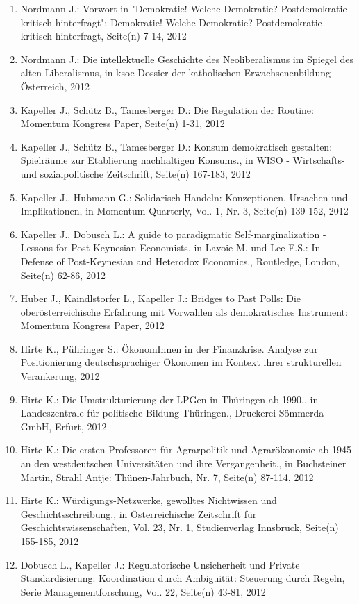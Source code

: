 \begin{enumerate}
	 \item Nordmann J.: Vorwort in "Demokratie! Welche Demokratie? Postdemokratie kritisch hinterfragt": Demokratie! Welche Demokratie? Postdemokratie kritisch hinterfragt, Seite(n) 7-14, 2012
	 \item Nordmann J.: Die intellektuelle Geschichte des Neoliberalismus im Spiegel des alten Liberalismus, in ksoe-Dossier der katholischen Erwachsenenbildung Österreich, 2012
	 \item Kapeller J., Schütz B., Tamesberger D.: Die Regulation der Routine: Momentum Kongress Paper, Seite(n) 1-31, 2012
	 \item Kapeller J., Schütz B., Tamesberger D.: Konsum demokratisch gestalten: Spielräume zur Etablierung nachhaltigen Konsums., in WISO - Wirtschafts- und sozialpolitische Zeitschrift, Seite(n) 167-183, 2012
	 \item Kapeller J., Hubmann G.: Solidarisch Handeln: Konzeptionen, Ursachen und Implikationen, in Momentum Quarterly, Vol. 1, Nr. 3, Seite(n) 139-152, 2012
	 \item Kapeller J., Dobusch L.: A guide to paradigmatic Self-marginalization - Lessons for Post-Keynesian Economists, in Lavoie M. und Lee F.S.: In Defense of Post-Keynesian and Heterodox Economics., Routledge, London, Seite(n) 62-86, 2012
	 \item Huber J., Kaindlstorfer L., Kapeller J.: Bridges to Past Polls: Die oberösterreichische Erfahrung mit Vorwahlen als demokratisches Instrument: Momentum Kongress Paper, 2012
	 \item Hirte K., Pühringer S.: ÖkonomInnen in der Finanzkrise. Analyse zur Positionierung deutschsprachiger Ökonomen im Kontext ihrer strukturellen Verankerung, 2012
	 \item Hirte K.: Die Umstrukturierung der LPGen in Thüringen ab 1990., in Landeszentrale für politische Bildung Thüringen., Druckerei Sömmerda GmbH, Erfurt, 2012
	 \item Hirte K.: Die ersten Professoren für Agrarpolitik und Agrarökonomie ab 1945 an den westdeutschen Universitäten und ihre Vergangenheit., in Buchsteiner Martin, Strahl Antje: Thünen-Jahrbuch, Nr. 7, Seite(n) 87-114, 2012
	 \item Hirte K.: Würdigungs-Netzwerke, gewolltes Nichtwissen und Geschichtsschreibung., in Österreichische Zeitschrift für Geschichtswissenschaften, Vol. 23, Nr. 1, Studienverlag Innsbruck, Seite(n) 155-185, 2012
	 \item Dobusch L., Kapeller J.: Regulatorische Unsicherheit und Private Standardisierung: Koordination durch Ambiguität: Steuerung durch Regeln, Serie Managementforschung, Vol. 22, Seite(n) 43-81, 2012

\end{enumerate}
